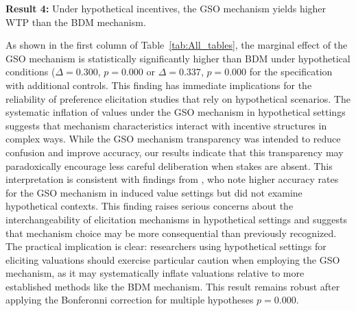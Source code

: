 \documentclass[12pt]{article}
\begin{document}
\vspace{0.5cm}



\textbf{Result 4:} Under hypothetical incentives, the GSO mechanism yields higher WTP than the BDM mechanism.

As shown in the first column of Table~\ref{tab:All_tables}, the marginal effect of the GSO mechanism is statistically significantly higher than BDM under hypothetical conditions (\(\Delta = 0.300\), \(p =0.000\) or \(\Delta = 0.337\), \(p =0.000\) for the specification with additional controls. This finding has immediate implications for the reliability of preference elicitation studies that rely on hypothetical scenarios.
The systematic inflation of values under the GSO mechanism in hypothetical settings suggests that mechanism characteristics interact with incentive structures in complex ways. While the GSO mechanism transparency was intended to reduce confusion and improve accuracy, our results indicate that this transparency may paradoxically encourage less careful deliberation when stakes are absent. This interpretation is consistent with findings from \citep{chakraborty_future_2025}, who note higher accuracy rates for the GSO  mechanism in induced value settings but did not examine hypothetical contexts.
 This finding raises serious concerns about the interchangeability of elicitation mechanisms in hypothetical settings and suggests that mechanism choice may be more consequential than previously recognized.
 The practical implication is clear: researchers using hypothetical settings for eliciting valuations should exercise particular caution when employing the GSO mechanism, as it may systematically inflate valuations relative to more established methods like the BDM mechanism. This result remains robust after applying the Bonferonni correction for multiple hypotheses \(p=0.000\).
\end{document}
